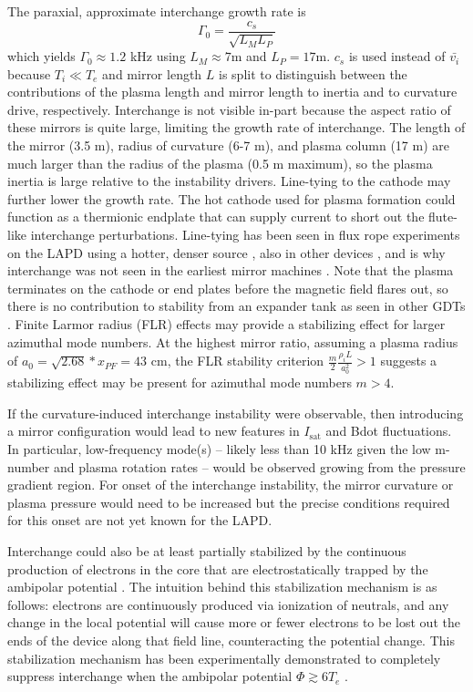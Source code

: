 The paraxial, approximate interchange growth rate is \cite{Post_1987,Ryutov_2011}
\begin{equation}
    \Gamma_0 = \frac{c_s}{\sqrt{L_M L_P}}
\end{equation}
which yields $\Gamma_0 \approx 1.2$ kHz using $L_M \approx 7$m and $L_P = 17$m. $c_s$ is used instead of $\bar{v_i}$ because $T_i \ll T_e$ and mirror length $L$ is split to distinguish between the contributions of the plasma length and mirror length to inertia and to curvature drive, respectively.
Interchange is not visible in-part because the aspect ratio of these mirrors is quite large, limiting the growth rate of interchange. The length of the mirror (3.5 m), radius of curvature (6-7 m), and plasma column (17 m) are much larger than the radius of the plasma (0.5 m maximum), so the plasma inertia is large relative to the instability drivers. Line-tying to the cathode may further lower the growth rate. The hot cathode used for plasma formation could function as a thermionic endplate that can supply current to short out the flute-like interchange perturbations. Line-tying has been seen in flux rope experiments on the LAPD using a hotter, denser source \cite{Compernolle_2011}, also in other devices \cite{Fornaca_1979}, and is why interchange was not seen in the earliest mirror machines \cite{Post_1987}. Note that the plasma terminates on the cathode or end plates before the magnetic field flares out, so there is no contribution to stability from an expander tank as seen in other GDTs \cite{Ryutov_2011,Ivanov_2013}. 
Finite Larmor radius (FLR) effects may provide a stabilizing effect for larger azimuthal mode numbers. 
At the highest mirror ratio, assuming a plasma radius of $a_0 =\sqrt{2.68} * x_{PF}=43$ cm, the FLR stability criterion $\frac{m}{2} \frac{\rho_i L}{a_0^2} > 1$ \cite{Ryutov_2011} suggests a stabilizing effect may be present for azimuthal mode numbers $m > 4$.

If the curvature-induced interchange instability were observable, then introducing a mirror configuration would lead to new features in $I_\text{sat}$ and Bdot fluctuations. In particular, low-frequency mode(s)  -- likely less than 10 kHz given the low m-number and plasma rotation rates -- would be observed growing from the pressure gradient region. For onset of the interchange instability, the mirror curvature or plasma pressure would need to be increased but the precise conditions required for this onset are not yet known for the LAPD.

Interchange could also be at least partially stabilized by the continuous production of electrons in the core that are electrostatically trapped by the ambipolar potential \cite{Guest_1971}. The intuition behind this stabilization mechanism is as follows: electrons are continuously produced via ionization of neutrals, and any change in the local potential will cause more or fewer electrons to be lost out the ends of the device along that field line, counteracting the potential change. This stabilization mechanism has been experimentally demonstrated  to completely suppress interchange when the ambipolar potential $\Phi \gtrsim 6T_e$ \cite{Komori_1987}.

